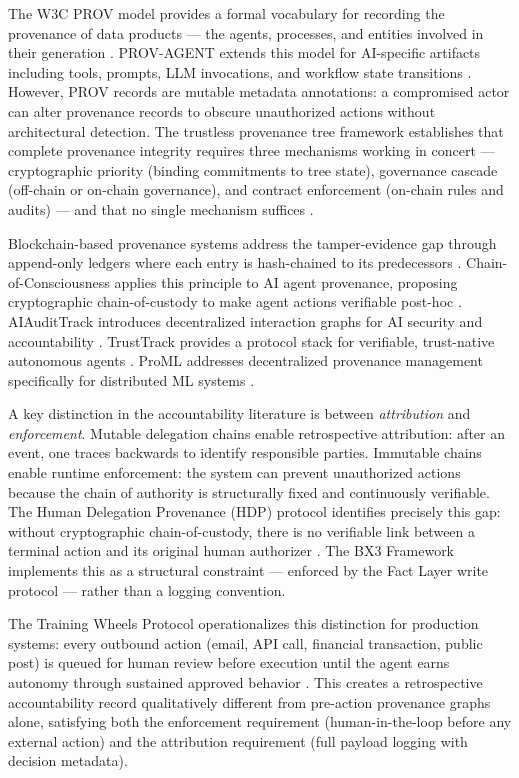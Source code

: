 The W3C PROV model provides a formal vocabulary for recording the provenance of data products — the agents, processes, and entities involved in their generation \cite{moreau2015-prov}. PROV-AGENT extends this model for AI-specific artifacts including tools, prompts, LLM invocations, and workflow state transitions \cite{provcagent2025}. However, PROV records are mutable metadata annotations: a compromised actor can alter provenance records to obscure unauthorized actions without architectural detection. The trustless provenance tree framework establishes that complete provenance integrity requires three mechanisms working in concert — cryptographic priority (binding commitments to tree state), governance cascade (off-chain or on-chain governance), and contract enforcement (on-chain rules and audits) — and that no single mechanism suffices \cite{trusttrack2025}.

Blockchain-based provenance systems address the tamper-evidence gap through append-only ledgers where each entry is hash-chained to its predecessors \cite{nakamoto2008bitcoin, hyperledger2015}. Chain-of-Consciousness applies this principle to AI agent provenance, proposing cryptographic chain-of-custody to make agent actions verifiable post-hoc \cite{chainofconsciousness2026}. AIAuditTrack introduces decentralized interaction graphs for AI security and accountability \cite{aaudittrack2025}. TrustTrack provides a protocol stack for verifiable, trust-native autonomous agents \cite{trusttrack2025}. ProML addresses decentralized provenance management specifically for distributed ML systems \cite{proml2022}.

A key distinction in the accountability literature is between \emph{attribution} and \emph{enforcement}. Mutable delegation chains enable retrospective attribution: after an event, one traces backwards to identify responsible parties. Immutable chains enable runtime enforcement: the system can prevent unauthorized actions because the chain of authority is structurally fixed and continuously verifiable. The Human Delegation Provenance (HDP) protocol identifies precisely this gap: without cryptographic chain-of-custody, there is no verifiable link between a terminal action and its original human authorizer \cite{hdp2025ietf, hdp2025arxiv, hdp2026}. The BX3 Framework implements this as a structural constraint — enforced by the Fact Layer write protocol — rather than a logging convention.

The Training Wheels Protocol operationalizes this distinction for production systems: every outbound action (email, API call, financial transaction, public post) is queued for human review before execution until the agent earns autonomy through sustained approved behavior \cite{training_wheels_protocol_2026}. This creates a retrospective accountability record qualitatively different from pre-action provenance graphs alone, satisfying both the enforcement requirement (human-in-the-loop before any external action) and the attribution requirement (full payload logging with decision metadata).

